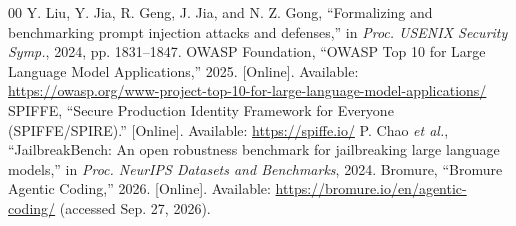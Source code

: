 \documentclass[conference]{IEEEtran}
\begin{document}
\begin{thebibliography}{00}
 Y. Liu, Y. Jia, R. Geng, J. Jia, and N. Z. Gong,
``Formalizing and benchmarking prompt injection attacks and defenses,'' in
\textit{Proc. USENIX Security Symp.}, 2024, pp. 1831--1847.
 OWASP Foundation, ``OWASP Top 10 for Large Language Model
Applications,'' 2025. [Online]. Available:
\url{https://owasp.org/www-project-top-10-for-large-language-model-applications/}
 SPIFFE, ``Secure Production Identity Framework for Everyone
(SPIFFE/SPIRE).'' [Online]. Available: \url{https://spiffe.io/}
 P. Chao \textit{et al.}, ``JailbreakBench: An
open robustness benchmark for jailbreaking large language models,'' in
\textit{Proc. NeurIPS Datasets and Benchmarks}, 2024.
 Bromure, ``Bromure Agentic Coding,'' 2026. [Online].
Available: \url{https://bromure.io/en/agentic-coding/} (accessed Sep. 27, 2026).
\end{thebibliography}
\end{document}
